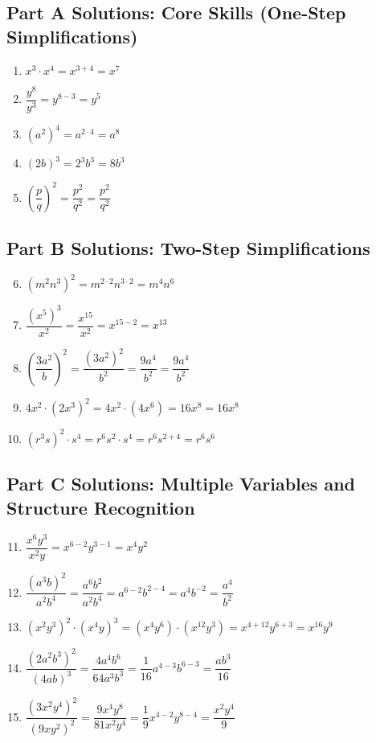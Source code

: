 \documentclass[12pt]{article}
\begin{document}
\subsection*{Part A Solutions: Core Skills (One-Step Simplifications)}
\begin{enumerate}
  \item \(x^3 \cdot x^4 = x^{3+4} = \boxed{x^7}\)
  \item \(\dfrac{y^8}{y^3} = y^{8-3} = \boxed{y^5}\)
  \item \((a^2)^4 = a^{2 \cdot 4} = \boxed{a^8}\)
  \item \((2b)^3 = 2^3 b^3 = \boxed{8b^3}\)
  \item \(\left(\dfrac{p}{q}\right)^2 = \dfrac{p^2}{q^2} = \boxed{\dfrac{p^2}{q^2}}\)
\end{enumerate}

\subsection*{Part B Solutions: Two-Step Simplifications}
\begin{enumerate}
  \setcounter{enumi}{5}
  \item \((m^2 n^3)^2 = m^{2 \cdot 2} n^{3 \cdot 2} = \boxed{m^4 n^6}\)
  \item \(\dfrac{(x^5)^3}{x^2} = \dfrac{x^{15}}{x^2} = x^{15-2} = \boxed{x^{13}}\)
  \item \(\left(\dfrac{3a^2}{b}\right)^2 = \dfrac{(3a^2)^2}{b^2} = \dfrac{9a^4}{b^2} = \boxed{\dfrac{9a^4}{b^2}}\)
  \item \(4x^2 \cdot (2x^3)^2 = 4x^2 \cdot (4x^6) = 16x^8 = \boxed{16x^8}\)
  \item \((r^3 s)^2 \cdot s^4 = r^{6} s^{2} \cdot s^4 = r^6 s^{2+4} = \boxed{r^6 s^6}\)
\end{enumerate}

\subsection*{Part C Solutions: Multiple Variables and Structure Recognition}
\begin{enumerate}
  \setcounter{enumi}{10}
  \item \(\dfrac{x^6 y^3}{x^2 y} = x^{6-2} y^{3-1} = \boxed{x^4 y^2}\)
  \item \(\dfrac{(a^3 b)^2}{a^2 b^4} = \dfrac{a^6 b^2}{a^2 b^4} = a^{6-2} b^{2-4} = a^4 b^{-2} = \boxed{\dfrac{a^4}{b^2}}\)
  \item \((x^2 y^3)^2 \cdot (x^4 y)^3 = (x^4 y^6) \cdot (x^{12} y^3) = x^{4+12} y^{6+3} = \boxed{x^{16} y^9}\)
  \item \(\dfrac{(2a^2 b^3)^2}{(4ab)^3} = \dfrac{4a^4 b^6}{64a^3 b^3} = \dfrac{1}{16} a^{4-3} b^{6-3} = \boxed{\dfrac{ab^3}{16}}\)
  \item \(\dfrac{(3x^2 y^4)^2}{(9xy^2)^2} = \dfrac{9x^4 y^8}{81x^2 y^4} = \dfrac{1}{9} x^{4-2} y^{8-4} = \boxed{\dfrac{x^2 y^4}{9}}\)
\end{enumerate}
\end{document}
